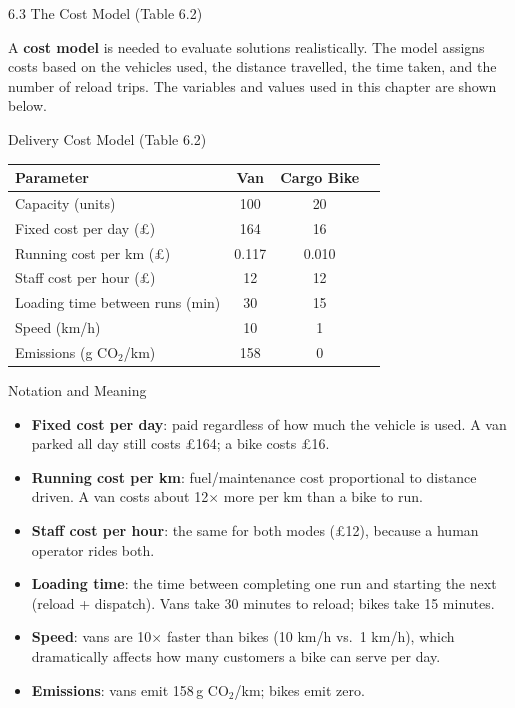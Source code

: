 \documentclass[aspectratio=169,10pt]{beamer}
\begin{document}
\begin{frame}[allowframebreaks]{6.3 The Cost Model (Table 6.2)}

A \textbf{cost model} is needed to evaluate solutions realistically.
The model assigns costs based on the vehicles used, the distance
travelled, the time taken, and the number of reload trips.
The variables and values used in this chapter are shown below.

\medskip
\begin{block}{Delivery Cost Model (Table 6.2)}
\begin{center}
\renewcommand{\arraystretch}{1.25}
\begin{tabular}{lccc}
\toprule
Parameter & Van & Cargo Bike \\
\midrule
Capacity (units) & 100 & 20 \\
Fixed cost per day (\pounds) & 164 & 16 \\
Running cost per km (\pounds) & 0.117 & 0.010 \\
Staff cost per hour (\pounds) & 12 & 12 \\
Loading time between runs (min) & 30 & 15 \\
Speed (km/h) & 10 & 1 \\
Emissions (g CO$_2$/km) & 158 & 0 \\
\bottomrule
\end{tabular}
\end{center}
\end{block}

\medskip
\begin{block}{Notation and Meaning}
\begin{itemize}
  \item \textbf{Fixed cost per day}: paid regardless of how much the
        vehicle is used.
        A van parked all day still costs \pounds164; a bike costs
        \pounds16.
  \item \textbf{Running cost per km}: fuel/maintenance cost proportional
        to distance driven.
        A van costs about 12$\times$ more per km than a bike to run.
  \item \textbf{Staff cost per hour}: the same for both modes (\pounds12),
        because a human operator rides both.
  \item \textbf{Loading time}: the time between completing one run and
        starting the next (reload + dispatch).
        Vans take 30 minutes to reload; bikes take 15 minutes.
  \item \textbf{Speed}: vans are 10$\times$ faster than bikes
        (10 km/h vs.\ 1 km/h), which dramatically affects how many
        customers a bike can serve per day.
  \item \textbf{Emissions}: vans emit 158\,g CO$_2$/km; bikes emit zero.
\end{itemize}
\end{block}


\end{frame}
\end{document}
